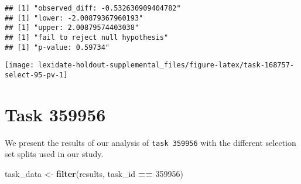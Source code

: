 \documentclass[
]{book}
\newenvironment{Shaded}{\begin{snugshade}}{\end{snugshade}}
\newcommand{\AttributeTok}[1]{\textcolor[rgb]{0.13,0.29,0.53}{#1}}
\newcommand{\DecValTok}[1]{\textcolor[rgb]{0.00,0.00,0.81}{#1}}
\newcommand{\FunctionTok}[1]{\textcolor[rgb]{0.13,0.29,0.53}{\textbf{#1}}}
\newcommand{\NormalTok}[1]{#1}
\newcommand{\OtherTok}[1]{\textcolor[rgb]{0.56,0.35,0.01}{#1}}
\newcommand{\SpecialCharTok}[1]{\textcolor[rgb]{0.81,0.36,0.00}{\textbf{#1}}}
\newcommand{\StringTok}[1]{\textcolor[rgb]{0.31,0.60,0.02}{#1}}
\begin{document}
\begin{Shaded}
\end{Shaded}

\begin{verbatim}
## [1] "observed_diff: -0.532630909404782"
## [1] "lower: -2.00879367960193"
## [1] "upper: 2.00879574403038"
## [1] "fail to reject null hypothesis"
## [1] "p-value: 0.59734"
\end{verbatim}

\texttt{[image: lexidate-holdout-supplemental\_files/figure-latex/task-168757-select-95-pv-1]}

\hypertarget{task-359956}{%
\chapter{Task 359956}\label{task-359956}}

We present the results of our analysis of \texttt{task\ 359956} with the different selection set splits used in our study.

\begin{Shaded}
\begin{Highlighting}[]
\NormalTok{task\_data }\OtherTok{\textless{}{-}} \FunctionTok{filter}\NormalTok{(results, task\_id }\SpecialCharTok{==} \DecValTok{359956}\NormalTok{)}
\end{Highlighting}
\end{Shaded}
\end{document}
